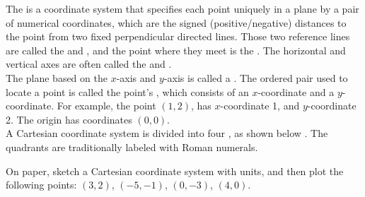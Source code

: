 \documentclass{ximera}
\begin{document}
\begin{definition}
The  is a coordinate system that specifies each point uniquely in a plane by a pair of numerical coordinates, which are the signed (positive/negative) distances to the point from two fixed perpendicular directed lines. Those two reference lines are called the  and , and the point where they meet is the . The horizontal and vertical axes are often called the  and .  \\

The plane based on the $x$-axis and $y$-axis is called a . The ordered pair used to locate a point is called the point's , which consists of an $x$-coordinate and a $y$-coordinate. For example, the point $(1,2)$, has $x$-coordinate 1,  and $y$-coordinate 2.   The origin has coordinates $(0,0)$. \\

A Cartesian coordinate system is divided into four , as shown below . The quadrants are traditionally labeled with Roman numerals.

\begin{image}
\end{image}

\end{definition}


\begin{example}
On paper, sketch a Cartesian coordinate system with units, and then plot the following points: $(3,2)$, $(-5,-1)$, $(0,-3)$, $(4,0)$.

\begin{explanation} 

\begin{image}
\end{image}

\end{explanation}
\end{example}
\end{document}
